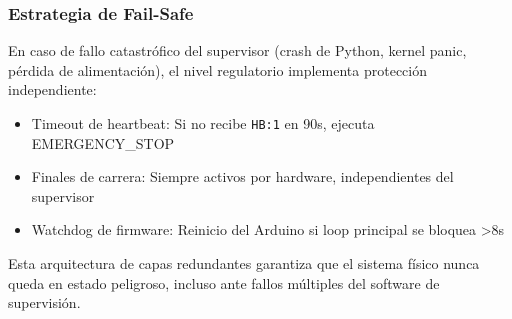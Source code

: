 \subsubsection{Estrategia de Fail-Safe}

En caso de fallo catastrófico del supervisor (crash de Python, kernel panic, pérdida de alimentación), el nivel regulatorio implementa protección independiente:

\begin{itemize}
    \item Timeout de heartbeat: Si no recibe \texttt{HB:1} en 90s, ejecuta EMERGENCY\_STOP
    \item Finales de carrera: Siempre activos por hardware, independientes del supervisor
    \item Watchdog de firmware: Reinicio del Arduino si loop principal se bloquea >8s
\end{itemize}

Esta arquitectura de capas redundantes garantiza que el sistema físico nunca queda en estado peligroso, incluso ante fallos múltiples del software de supervisión.
